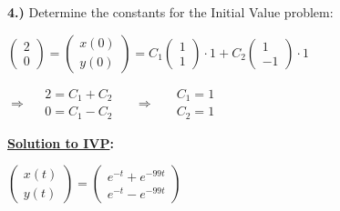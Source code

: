\documentclass[a4paper,12pt]{report}
\begin{document}
	\noindent \textbf{4.)} Determine the constants for the Initial Value problem:
	\medskip
	\begin{center}
	$
	\begin{pmatrix}
		2\\
		0
	\end{pmatrix}
	=
	\begin{pmatrix}
		x(0)\\
		y(0)
	\end{pmatrix}
	= C_1
	\begin{pmatrix}
		1\\
		1
	\end{pmatrix}
		\cdot 1 + C_2
	\begin{pmatrix}
		1\\
		-1
	\end{pmatrix}
	\cdot 1$\\
		\bigskip
		
	
	$	\Rightarrow \quad
  	\begin{array}{l}
		2 = C_1 + C_2\\
		0 = C_1 - C_2
	\end{array}
	$
	$\quad \Rightarrow \quad$
	$
	\begin{array}{l}
		C_1 = 1\\
		C_2 = 1
	\end{array}
	$ \\
	\bigskip
	\bigskip
	\fbox
	{
		\parbox{0.5\textwidth}
		{
			\textbf{\underline{Solution to IVP}:}
			\begin{center}
			$
				\begin{pmatrix}
					x(t)\\
					y(t)
				\end{pmatrix}
				=
				\begin{pmatrix}
					e^{-t} + e^{-99t}\\
					e^{-t} - e^{-99t}
				\end{pmatrix}	
			$
			\end{center}
		}
	}\\
	\end{center}
	\bigskip
\end{document}
